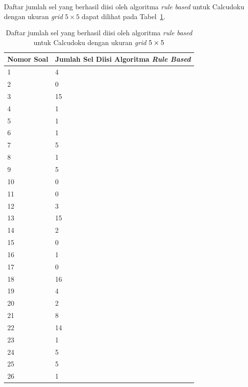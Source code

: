 \documentclass[11pt,a4paper,twoside,openright]{article}
\begin{document}
\begin{enumerate}
Daftar jumlah sel yang berhasil diisi oleh algoritma \textit{rule based} untuk Calcudoku dengan ukuran \textit{grid} \begin{math}5 \times 5\end{math} dapat dilihat pada Tabel~\ref{tab:tabel2}.

\begin{table}
\centering
\captionsetup{justification=centering}
\caption[Daftar jumlah sel yang berhasil diisi oleh algoritma \textit{rule based} untuk Calcudoku dengan ukuran \textit{grid} \protect\begin{math}5 \times 5\protect\end{math}]{Daftar jumlah sel yang berhasil diisi oleh algoritma \textit{rule based} untuk Calcudoku dengan ukuran \textit{grid} \protect\begin{math}5 \times 5\protect\end{math}}
\begin{tabular}{| l | l |}
\hline
Nomor Soal & Jumlah Sel Diisi Algoritma \textit{Rule Based} \\
\hline \hline
1 & 4 \\
\hline
2 & 0 \\
\hline
3 & 15 \\
\hline
4 & 1 \\
\hline
5 & 1 \\
\hline
6 & 1 \\
\hline
7 & 5 \\
\hline
8 & 1 \\
\hline
9 & 5 \\
\hline
10 & 0 \\
\hline
11 & 0 \\
\hline
12 & 3 \\
\hline
13 & 15 \\
\hline
14 & 2 \\
\hline
15 & 0 \\
\hline
16 & 1 \\
\hline
17 & 0 \\
\hline
18 & 16 \\
\hline
19 & 4 \\
\hline
20 & 2 \\
\hline
21 & 8 \\
\hline
22 & 14 \\
\hline
23 & 1 \\
\hline
24 & 5 \\
\hline
25 & 5 \\
\hline
26 & 1 \\
\hline
\end{tabular}
\label{tab:tabel2}
\end{table}


\end{enumerate}
\end{document}
